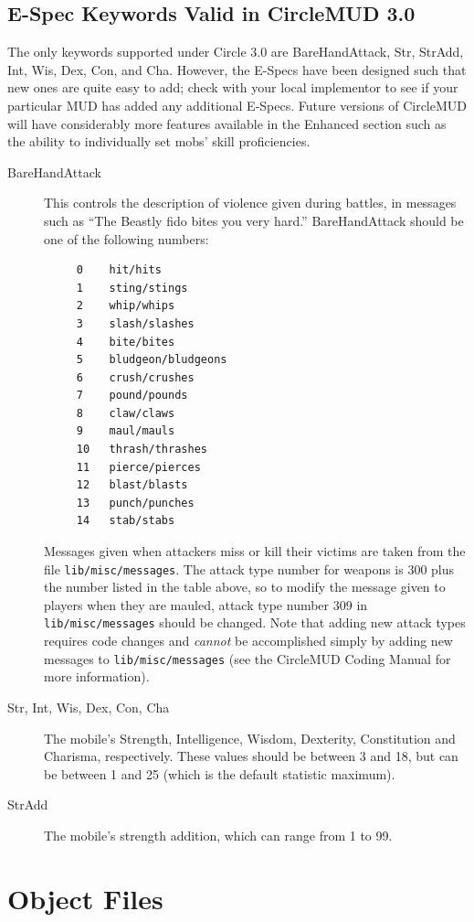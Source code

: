 \documentclass[11pt]{article}
\begin{document}
\subsection{E-Spec Keywords Valid in CircleMUD 3.0}
The only keywords supported under Circle 3.0 are BareHandAttack, Str, StrAdd, Int, Wis, Dex, Con, and Cha.  However, the E-Specs have been designed such that new ones are quite easy to add; check with your local implementor to see if your particular MUD has added any additional E-Specs.  Future versions of CircleMUD will have considerably more features available in the Enhanced section such as the ability to individually set mobs' skill proficiencies.
\begin{description}
\item[BareHandAttack] This controls the description of violence given during battles, in messages such as ``The Beastly fido bites you very hard.''  BareHandAttack should be one of the following numbers:
\begin{verbatim}
     0    hit/hits
     1    sting/stings
     2    whip/whips
     3    slash/slashes
     4    bite/bites
     5    bludgeon/bludgeons
     6    crush/crushes
     7    pound/pounds
     8    claw/claws
     9    maul/mauls
     10   thrash/thrashes
     11   pierce/pierces
     12   blast/blasts
     13   punch/punches
     14   stab/stabs
\end{verbatim}
Messages given when attackers miss or kill their victims are taken from the file \texttt{lib/misc/messages}. The attack type number for weapons is 300 plus the number listed in the table above, so to modify the message given to players when they are mauled, attack type number 309 in \texttt{lib/misc/messages} should be changed.  Note that adding new attack types requires code changes and {\em cannot} be accomplished simply by adding new messages to \texttt{lib/misc/messages} (see the CircleMUD Coding Manual for more information).
\item[Str, Int, Wis, Dex, Con, Cha] The mobile's Strength, Intelligence, Wisdom, Dexterity, Constitution and Charisma, respectively.  These values should be between 3 and 18, but can be between 1 and 25 (which is the default statistic maximum).
\item[StrAdd] The mobile's strength addition, which can range from 1 to 99.
\end{description}

\section{Object Files}
\end{document}
